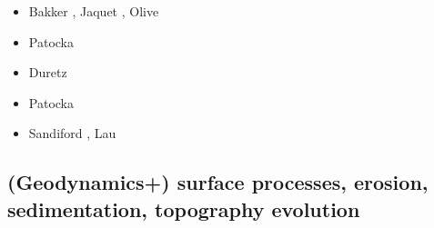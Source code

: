 \begin{scriptsize}
\begin{itemize}
\item[\twothousandsixteen] Bakker \etal \cite{bafl16}, Jaquet \etal \cite{jads16},
                           Olive \etal \cite{olbm16}
\item[\twothousandseventeen] Patocka \cite{pact17}
\item[\twothousandeighteen] Duretz \etal \cite{dusd18}
\item[\twothousandnineteen] Patocka \etal \cite{pact19}
\item[\twothousandtwenty] Sandiford \etal \cite{sams20}, Lau \etal \cite{lahh20}
\end{itemize}
\end{scriptsize}

\subsection{(Geodynamics+) surface processes, erosion, sedimentation, topography evolution}

